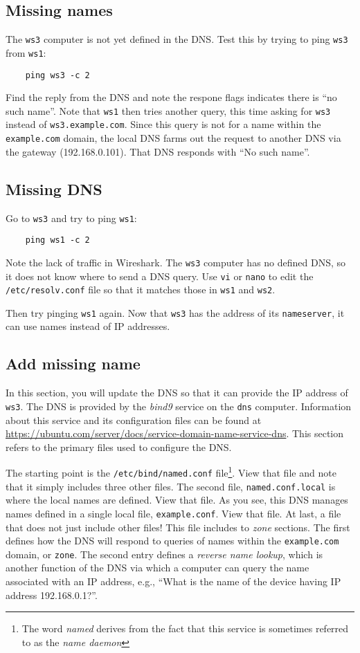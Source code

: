 \subsection{Missing names}
The {\tt ws3} computer is not yet defined in the DNS.  Test this by trying to ping {\tt ws3} from {\tt ws1}:
\begin{verbatim}
    ping ws3 -c 2
\end{verbatim}
Find the reply from the DNS and note the respone flags indicates there is ``no such name''.
Note that {\tt ws1} then tries another query, this time asking for {\tt ws3} instead of {\tt ws3.example.com}.
Since this query is not for a name within the {\tt example.com} domain, the local DNS farms out the request
to another DNS via the gateway (192.168.0.101).  That DNS responds with ``No such name''.

\subsection{Missing DNS}
Go to {\tt ws3} and try to ping {\tt ws1}:
\begin{verbatim}
    ping ws1 -c 2
\end{verbatim}
\noindent Note the lack of traffic in Wireshark.  The {\tt ws3} computer has no defined DNS, so it does not
know where to send a DNS query.  Use {\tt vi} or {\tt nano} to edit the {\tt /etc/resolv.conf} file so that
it matches those in {\tt ws1} and {\tt ws2}.

Then try pinging {\tt ws1} again.  Now that {\tt ws3} has the address of its {\tt nameserver}, it can use
names instead of IP addresses.

\subsection{Add missing name}
In this section, you will update the DNS so that it can provide the IP address of {\tt ws3}.
The DNS is provided by the \textit{bind9} service on the {\tt dns} computer.  Information about this service and
its configuration files can be found at \url{https://ubuntu.com/server/docs/service-domain-name-service-dns}.
This section refers to the primary files used to configure the DNS.  

The starting point is the {\tt /etc/bind/named.conf} file\footnote{The word \textit{named} derives from
the fact that this service is sometimes referred to as the \textit{name daemon}}.  View that file and note that it simply includes
three other files.  The second file, {\tt named.conf.local} is where the local names are defined.
View that file.  As you see, this DNS manages names defined in a single local file, {\tt example.conf}. 
View that file.  At last, a file that does not just include other files!  This file includes to \textit{zone}
sections.  The first defines how the DNS will respond to queries of names within the {\tt example.com}
domain, or {\tt zone}.  The second entry defines a \textit{reverse name lookup}, which is another function of
the DNS via which a computer can query the name associated with an IP address, e.g., ``What is the name of
the device having IP address 192.168.0.1?''.

